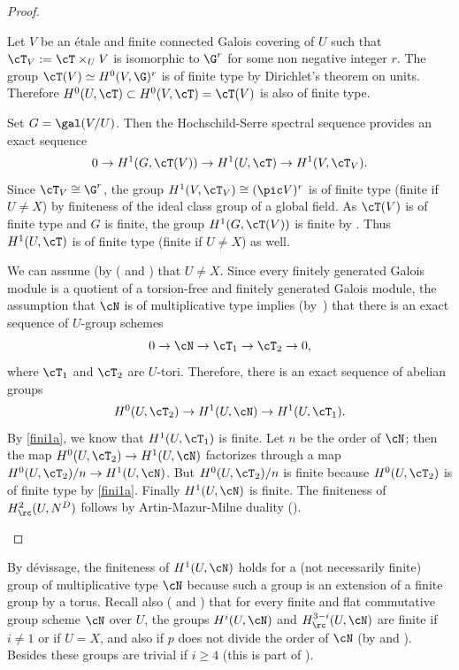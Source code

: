 \skpt\begin{proof}
\begin{enumeratea}
\item
Let $V$ be an étale and finite connected
Galois covering of $U$ such that $\cT_V:=\cT \times_U V$
is isomorphic to $\G^r$ for some non negative integer $r$.
The group $\cT(V) \simeq
H^0(V,\G)^r$ is of finite type by Dirichlet's theorem on units. Therefore
$H^0(U,\cT) \subset H^0(V,\cT)=\cT(V)$
is also of finite type.

Set $G=\gal(V/U)$. Then the Hochschild-Serre spectral sequence provides an
exact sequence
\[
0 \to H^1(G,\cT(V)) \to H^1(U,\cT)
\to H^1(V,\cT_V).
\]
Since $\cT_V \cong \G^r$, the group
$H^1(V,\cT_V) \cong (\pic V)^r$ is of finite type
(\resp finite if $U \neq X$) by finiteness of the ideal class group
of a global field.
As $\cT(V)$ is of finite type and $G$ is finite, the group
$H^1(G,\cT(V))$ is finite by \cite[Chap.\,VIII, Cor.\,2]{col}.
Thus $H^1(U,\cT)$ is of
finite type (\resp finite if $U \neq X$) as well.

\item
We can assume (by (\cite[Lem.\,III.8.9]{MilADT}
and \cite[Cor.\,4.9]{DemH}) that $U \neq X$.
Since every finitely generated Galois module is a quotient of a
torsion-free and finitely generated Galois module, the
assumption that $\cN$ is of multiplicative type implies
(by~\cite[X, Prop.\,1.1]{sga3})
that there is an exact sequence of $U$-group schemes
\[
0 \to \cN \to \cT_1 \to \cT_2 \to 0,
\]
where $\cT_1$ and $\cT_2$ are $U$-tori. Therefore, there is
an exact sequence of abelian groups
\[
H^0(U,\cT_2) \to H^1(U, \cN) \to H^1(U, \cT_1).
\]
By \eqref{fini1a}, we know that $H^1(U, \cT_1)$ is finite. Let $n$ be the order
of $\cN$; then the map $H^0(U,\cT_2) \to H^1(U, \cN)$
factorizes through a map $H^0(U,\cT_2)/n \to H^1(U, \cN)$.
But $H^0(U,\cT_2)/n$ is finite because $H^0(U,\cT_2)$
is of finite type by \eqref{fini1a}. Finally $H^1(U, \cN)$ is finite. The
finiteness of $H^2_\rc(U,N^D)$ follows by Artin-Mazur-Milne
duality (\cite[Th.\,1.1]{DemH}).\qedhere
\end{enumeratea}
\end{proof}

\begin{rema} \label{fini2}
By dévissage, the finiteness of $H^1(U, \cN)$ holds for
a (not necessarily finite)
group of multiplicative type $\cN$
because such a group is an extension of
a finite group by a torus. Recall also (\cite[Lem.\,III.8.9]{MilADT}
and \cite[Cor.\,4.8]{DemH})
that for every finite and flat commutative
group scheme $\cN$ over $U$, the groups $H^i(U,\cN)$ and
$H^{3-i}_\rc(U,\cN)$ are finite if $i \neq 1$ or if $U=X$, and
also if $p$ does not divide the order of $\cN$ (by \cite[Prop.\,2.1\,(4)]{DemH} and \cite[Th.\,II.3.1]{MilADT}).
Besides these groups are trivial if $i \geq 4$ (this is part of \cite[Th.\,1.1]{DemH}).
\end{rema}


